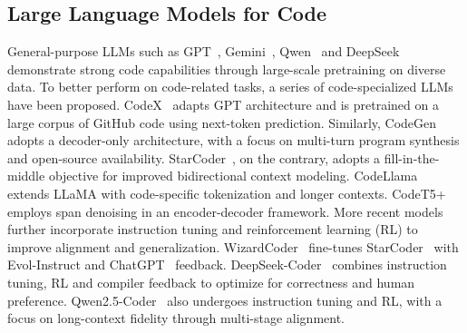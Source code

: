 \documentclass[10pt,conference]{IEEEtran}
\begin{document}
\subsection{Large Language Models for Code}
General-purpose LLMs such as GPT~\cite{achiam2023gpt}, Gemini~\cite{team2023gemini, team2024gemini}, Qwen~\cite{bai2023qwen, yang2024qwen2} and DeepSeek~\cite{guo2025deepseek} demonstrate strong code capabilities through large-scale pretraining on diverse data. To better perform on code-related tasks, a series of code-specialized LLMs have been proposed. CodeX~\cite{chen2021evaluating} adapts GPT architecture and is pretrained on a large corpus of GitHub code using next-token prediction. Similarly, CodeGen~\cite{nijkamp2022codegen} adopts a decoder-only architecture, with a focus on multi-turn program synthesis and open-source availability. StarCoder~\cite{li2023starcoder}, on the contrary, adopts a fill-in-the-middle objective for improved bidirectional context modeling. CodeLlama~\cite{roziere2023code} extends LLaMA with code-specific tokenization and longer contexts. CodeT5+\cite{wang2023codet5+} employs span denoising in an encoder-decoder framework. More recent models further incorporate instruction tuning and reinforcement learning (RL) to improve alignment and generalization. WizardCoder~\cite{luo2023wizardcoder} fine-tunes StarCoder~\cite{li2023starcoder} with Evol-Instruct and ChatGPT~\cite{openai2022chatgpt} feedback. DeepSeek-Coder~\cite{guo2024deepseek} combines instruction tuning, RL and compiler feedback to optimize for correctness and human preference. Qwen2.5-Coder~\cite{hui2024qwen2} also undergoes instruction tuning and RL, with a focus on long-context fidelity through multi-stage alignment.
\end{document}
